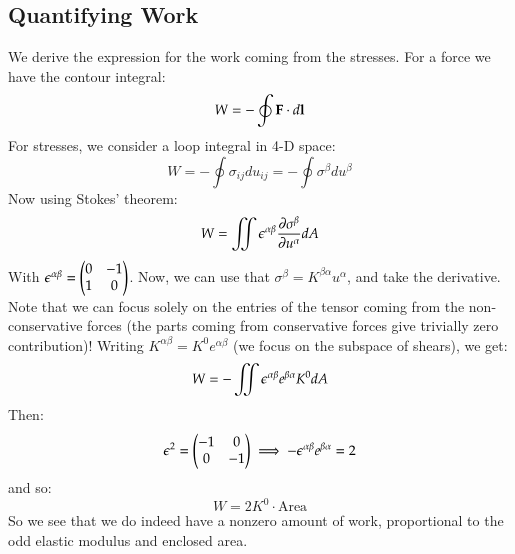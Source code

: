 \subsection{Quantifying Work}
We derive the expression for the work coming from the stresses. For a force we have the contour integral:
\begin{equation}
    W = -\oint \mathbf{F} \cdot d\mathbf{l}
\end{equation}
For stresses, we consider a loop integral in 4-D space:
\begin{equation}
    W = -\oint \sigma_{ij}du_{ij} = -\oint \sigma^\beta du^\beta
\end{equation}
Now using Stokes' theorem:
\begin{equation}
    W = \iint \epsilon^{\alpha\beta}\frac{\partial \sigma^\beta}{\partial u^\alpha}dA
\end{equation}
With $\epsilon^{\alpha\beta} = \begin{pmatrix}0 & -1 \\ 1 & 0\end{pmatrix}$. Now, we can use that $\sigma^\beta = K^{\beta\alpha}u^\alpha$, and take the derivative. Note that we can focus solely on the entries of the tensor coming from the non-conservative forces (the parts coming from conservative forces give trivially zero contribution)! Writing $K^{\alpha\beta} = K^0e^{\alpha\beta}$ (we focus on the subspace of shears), we get:
\begin{equation}
    W = -\iint \epsilon^{\alpha\beta}e^{\beta\alpha}K^0 dA
\end{equation}
Then:
\begin{equation}
    \epsilon^2 = \begin{pmatrix}-1 & 0 \\ 0 & -1\end{pmatrix} \implies -\epsilon^{\alpha\beta}e^{\beta\alpha} = 2
\end{equation}
and so:
\begin{equation}
    W = 2K^0 \cdot \text{Area}
\end{equation}
So we see that we do indeed have a nonzero amount of work, proportional to the odd elastic modulus and enclosed area.